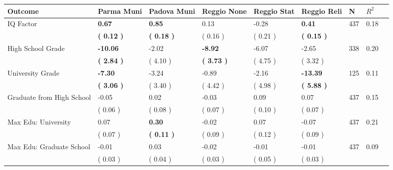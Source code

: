 \begin{tabular}{L{6.2cm} C{1.8cm} C{1.8cm} C{1.8cm} C{1.8cm} C{1.8cm} C{1.8cm} C{0.3cm} C{0.3cm}}
\toprule
 \textbf{Outcome} & \textbf{Parma Muni} & \textbf{Padova Muni} & \textbf{Reggio None} & \textbf{Reggio Stat} & \textbf{Reggio Reli} & \textbf{N} & \textbf{$ R^2$} \\
\midrule
IQ Factor & \textbf{     0.67} & \textbf{     0.85} &      0.13 &     -0.28 & \textbf{     0.41}  & 437 &       0.18 \\ 
 & \textbf{(     0.12 )} & \textbf{(     0.18 )} & (     0.16 ) & (     0.21 ) & \textbf{(     0.15 )}  & \\
High School Grade & \textbf{   -10.06} &     -2.02 & \textbf{    -8.92} &     -6.07 &     -2.65  & 338 &       0.20 \\ 
 & \textbf{(     2.84 )} & (     4.10 ) & \textbf{(     3.73 )} & (     4.75 ) & (     3.32 )  & \\
University Grade & \textbf{    -7.30} &     -3.24 &     -0.89 &     -2.16 & \textbf{   -13.39}  & 125 &       0.11 \\ 
 & \textbf{(     3.06 )} & (     3.40 ) & (     4.42 ) & (     4.98 ) & \textbf{(     5.88 )}  & \\
Graduate from High School &     -0.05 &      0.02 &     -0.03 &      0.09 &      0.07  & 437 &       0.15 \\ 
 & (     0.06 ) & (     0.08 ) & (     0.07 ) & (     0.10 ) & (     0.07 )  & \\
Max Edu: University &      0.07 & \textbf{     0.30} &     -0.02 &      0.07 &     -0.07  & 437 &       0.21 \\ 
 & (     0.07 ) & \textbf{(     0.11 )} & (     0.09 ) & (     0.12 ) & (     0.09 )  & \\
Max Edu: Graduate School &     -0.01 &      0.03 &     -0.02 &     -0.01 &     -0.01  & 437 &       0.09 \\ 
 & (     0.03 ) & (     0.04 ) & (     0.03 ) & (     0.05 ) & (     0.03 )  & \\
\bottomrule
\end{tabular}
